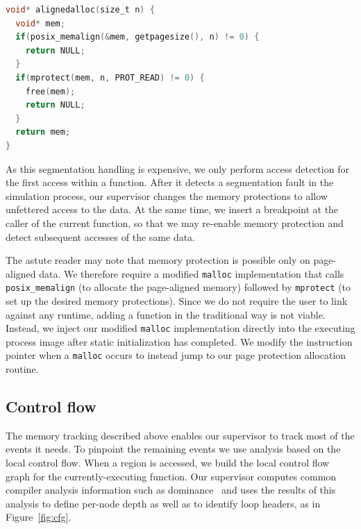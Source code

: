 \begin{lstlisting}[label=lst:malloc,language=C,caption=Replacement \texttt{malloc}
implementation used for tracking field access.]
void* alignedalloc(size_t n) {
  void* mem;
  if(posix_memalign(&mem, getpagesize(), n) != 0) {
    return NULL;
  }
  if(mprotect(mem, n, PROT_READ) != 0) {
    free(mem);
    return NULL;
  }
  return mem;
}
\end{lstlisting}

As this segmentation handling is expensive, we only perform access
detection for the first access within a function.  After it detects a
segmentation fault in the simulation process, our supervisor changes
the memory protections to allow unfettered access to the data.  At
the same time, we insert a breakpoint at the caller of the current
function, so that we may re-enable memory protection and detect
subsequent accesses of the same data.

The astute reader may note that memory protection is possible only on
page-aligned data.  We therefore require a modified \texttt{malloc}
implementation that calls \texttt{posix\_memalign} (to allocate the
page-aligned memory) followed by \texttt{mprotect} (to set up the
desired memory protections).  Since we do not require the user to link
against any runtime, adding a function in the traditional way is not
viable.  Instead, we inject our modified \texttt{malloc} implementation
directly into the executing process image after static initialization
has completed.  We modify the instruction pointer when a
\texttt{malloc} occurs to instead jump to our page protection
allocation routine.

\subsection{Control flow}

The memory tracking described above enables our supervisor to track
most of the events it needs.  To pinpoint the remaining events we use
analysis based on the local control flow.  When a region is accessed,
we build the local control flow graph for the currently-executing
function.  Our supervisor computes common compiler analysis
information such as dominance~\cite{Torczon:2007:Compiler} and uses
the results of this analysis to define per-node depth as well as to
identify
loop headers, as in Figure~\ref{fig:cfg}.

